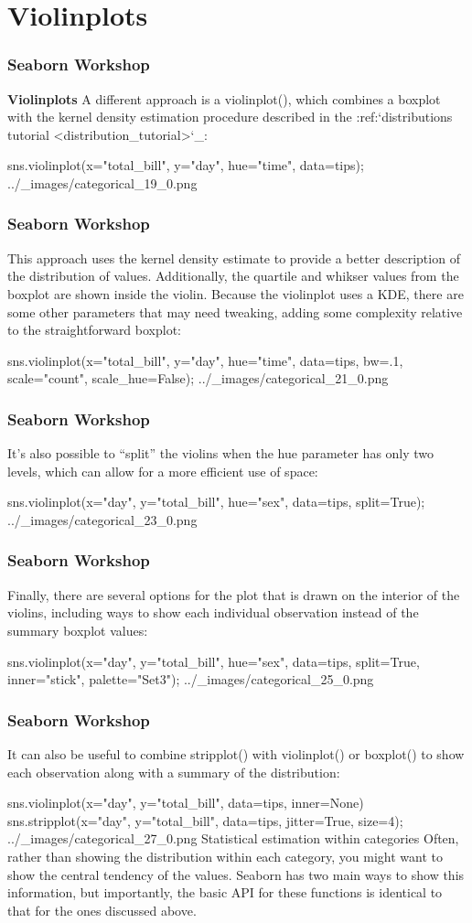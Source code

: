 \section{Violinplots}
\begin{frame}[fragile]
\frametitle{Seaborn Workshop}
\large
\noindent \textbf{Violinplots}
A different approach is a violinplot(), which combines a boxplot with the kernel density estimation procedure described in the :ref:`distributions tutorial <distribution_tutorial>`_:

sns.violinplot(x="total_bill", y="day", hue="time", data=tips);
../_images/categorical_19_0.png
\end{frame}
\begin{frame}[fragile]
\frametitle{Seaborn Workshop}
\large
This approach uses the kernel density estimate to provide a better description of the distribution of values. Additionally, the quartile and whikser values from the boxplot are shown inside the violin. Because the violinplot uses a KDE, there are some other parameters that may need tweaking, adding some complexity relative to the straightforward boxplot:

sns.violinplot(x="total_bill", y="day", hue="time", data=tips,
               bw=.1, scale="count", scale_hue=False);
../_images/categorical_21_0.png
\end{frame}
\begin{frame}[fragile]
\frametitle{Seaborn Workshop}
\large It’s also possible to “split” the violins when the hue parameter has only two levels, which can allow for a more efficient use of space:

sns.violinplot(x="day", y="total_bill", hue="sex", data=tips, split=True);
../_images/categorical_23_0.png
\end{frame}
\begin{frame}[fragile]
	\frametitle{Seaborn Workshop}
Finally, there are several options for the plot that is drawn on the interior of the violins, including ways to show each individual observation instead of the summary boxplot values:

sns.violinplot(x="day", y="total_bill", hue="sex", data=tips,
               split=True, inner="stick", palette="Set3");
../_images/categorical_25_0.png
\end{frame}
\begin{frame}[fragile]
	\frametitle{Seaborn Workshop}
It can also be useful to combine stripplot() with violinplot() or boxplot() to show each observation along with a summary of the distribution:

sns.violinplot(x="day", y="total_bill", data=tips, inner=None)
sns.stripplot(x="day", y="total_bill", data=tips, jitter=True, size=4);
../_images/categorical_27_0.png
Statistical estimation within categories
Often, rather than showing the distribution within each category, you might want to show the central tendency of the values. Seaborn has two main ways to show this information, but importantly, the basic API for these functions is identical to that for the ones discussed above.
\end{frame}
